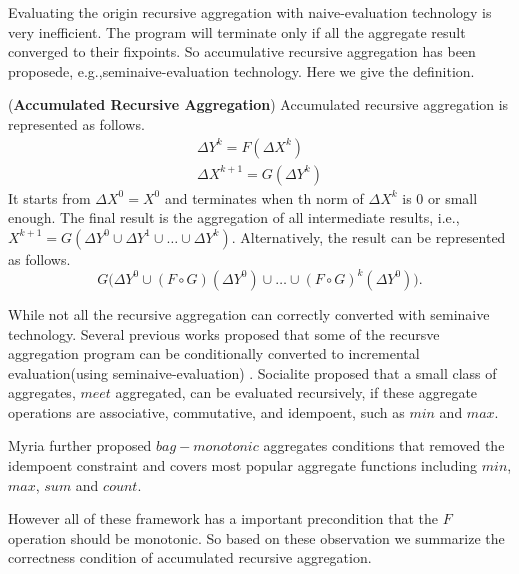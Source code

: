 {\color{red}
	Evaluating  the origin recursive aggregation with naive-evaluation technology is very inefficient. The program will terminate only if all the aggregate result converged to their fixpoints. So accumulative recursive aggregation has been proposede, e.g.,seminaive-evaluation technology. Here we give the definition.
	
\begin{definition}
	\label{def:accumasync}
	(\textbf{Accumulated Recursive Aggregation}) Accumulated recursive aggregation is represented as follows.
	\begin{equation}\label{eq:accumasync}
	\begin{aligned}
	\Delta Y^{k}= F(\Delta X^k)\\
	\Delta X^{k+1}= G(\Delta Y^{k})
	\end{aligned}
	\end{equation}
	It starts from $\Delta X^0=X^0$ and terminates when th norm of $\Delta X^k$ is 0 or small enough. The final result is the aggregation of all intermediate results, i.e., $X^{k+1}=G(\Delta Y^{0} \cup \Delta Y^{1} \cup \ldots \cup \Delta Y^{k})$. Alternatively, the result can be represented as follows.
	\begin{equation}
	\label{eq:accumasyncres}
	G\Big(\Delta Y^0\cup (F\circ G)(\Delta Y^0)\cup\ldots\cup (F\circ G)^k(\Delta Y^0)\Big).
	\end{equation}
\end{definition}
	
	
While not all the recursive aggregation can correctly converted with seminaive technology.  Several previous works proposed that some of the recursve aggregation program can be conditionally converted to incremental evaluation(using seminaive-evaluation) . Socialite\cite{} proposed that a small class of aggregates, $meet$ aggregated, can be evaluated recursively, if these aggregate operations are associative, commutative, and idempoent, such as $min$ and $max$.
	
Myria \cite{} further proposed $bag-monotonic$ aggregates conditions that removed the idempoent constraint and covers most popular aggregate functions including $min$, $max$, $sum$ and $count$.
 
However all of these framework has a important precondition that the $F$ operation should be monotonic. So based on these observation we summarize the correctness condition  of accumulated recursive aggregation.
}


